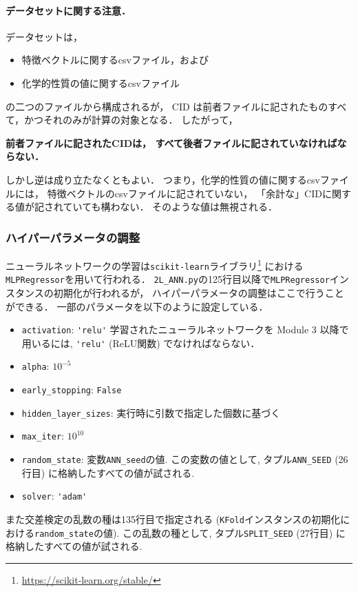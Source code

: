 \documentclass[11pt, titlepage, dvipdfmx, twoside]{jarticle}
\begin{document}
\paragraph{データセットに関する注意．}
データセットは，
\begin{itemize}
\item 特徴ベクトルに関するcsvファイル，および
\item 化学的性質の値に関するcsvファイル
\end{itemize}
の二つのファイルから構成されるが，
CID は前者ファイルに記されたものすべて，かつそれのみが計算の対象となる．
したがって，
\begin{center}
  {\bf 前者ファイルに記されたCIDは，
  すべて後者ファイルに記されていなければならない．}
\end{center}
しかし逆は成り立たなくともよい．
つまり，化学的性質の値に関するcsvファイルには，
特徴ベクトルのcsvファイルに記されていない，
「余計な」CIDに関する値が記されていても構わない．
そのような値は無視される．

\subsubsection{ハイパーパラメータの調整}
ニューラルネットワークの学習は{\tt scikit-learn}ライブラリ\footnote{\url{https://scikit-learn.org/stable/}}
における{\tt MLPRegressor}を用いて行われる．
\verb|2L_ANN.py|の125行目以降で\verb|MLPRegressor|インスタンスの初期化が行われるが，
ハイパーパラメータの調整はここで行うことができる．
一部のパラメータを以下のように設定している．
\begin{itemize}
\item \verb|activation|: \verb|'relu'| {\color{red}{\bf 注意:} 学習されたニューラルネットワークを Module 3 以降で用いるには, \verb|'relu'| (ReLU関数) でなければならない．}
\item \verb|alpha|: $10^{-5}$
\item \verb|early_stopping|: \verb|False|
\item \verb|hidden_layer_sizes|: 実行時に引数で指定した個数に基づく
\item \verb|max_iter|: $10^{10}$
\item \verb|random_state|: 変数\verb|ANN_seed|の値. この変数の値として, タプル\verb|ANN_SEED| (26行目) に格納したすべての値が試される. 
\item \verb|solver|: \verb|'adam'|
\end{itemize}

また交差検定の乱数の種は135行目で指定される ({\tt KFold}インスタンスの初期化における{\tt random\_state}の値).
この乱数の種として, タプル\verb|SPLIT_SEED| (27行目) に格納したすべての値が試される. 
\end{document}
